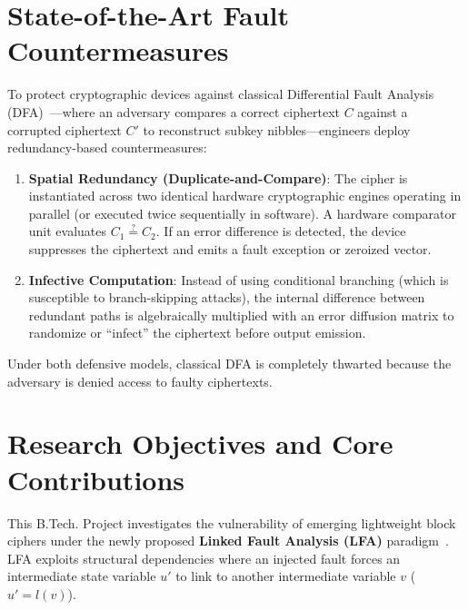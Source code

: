 \section{State-of-the-Art Fault Countermeasures}
\label{sec:countermeasures_state_of_art}
To protect cryptographic devices against classical Differential Fault Analysis (DFA)~\cite{biham1997differential}---where an adversary compares a correct ciphertext $C$ against a corrupted ciphertext $C'$ to reconstruct subkey nibbles---engineers deploy redundancy-based countermeasures:
\begin{enumerate}
    \item \textbf{Spatial Redundancy (Duplicate-and-Compare)}: The cipher is instantiated across two identical hardware cryptographic engines operating in parallel (or executed twice sequentially in software). A hardware comparator unit evaluates $C_1 \stackrel{?}{=} C_2$. If an error difference is detected, the device suppresses the ciphertext and emits a fault exception or zeroized vector.
    \item \textbf{Infective Computation}: Instead of using conditional branching (which is susceptible to branch-skipping attacks), the internal difference between redundant paths is algebraically multiplied with an error diffusion matrix to randomize or ``infect'' the ciphertext before output emission.
\end{enumerate}
Under both defensive models, classical DFA is completely thwarted because the adversary is denied access to faulty ciphertexts.

\section{Research Objectives and Core Contributions}
\label{sec:contributions}
This B.Tech. Project investigates the vulnerability of emerging lightweight block ciphers under the newly proposed \textbf{Linked Fault Analysis (LFA)} paradigm~\cite{beigizad2024linked}. LFA exploits structural dependencies where an injected fault forces an intermediate state variable $u'$ to link to another intermediate variable $v$ ($u' = l(v)$).

